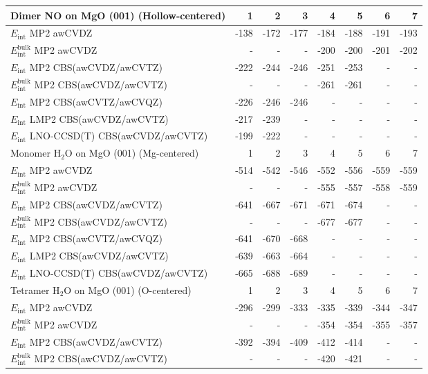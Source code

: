 \begin{longtable}{lrrrrrrr}
\toprule
Dimer NO on MgO (001) (Hollow-centered) & 1 & 2 & 3 & 4 & 5 & 6 & 7 \\ 
\midrule
$E_\textrm{int}$ MP2 awCVDZ & -138 & -172 & -177 & -184 & -188 & -191 & -193 \\
$E_\textrm{int}^\textrm{bulk}$ MP2 awCVDZ & - & - & - & -200 & -200 & -201 & -202 \\
$E_\textrm{int}$ MP2 CBS(awCVDZ/awCVTZ) & -222 & -244 & -246 & -251 & -253 & - & - \\
$E_\textrm{int}^\textrm{bulk}$ MP2 CBS(awCVDZ/awCVTZ) & - & - & - & -261 & -261 & - & - \\
$E_\textrm{int}$ MP2 CBS(awCVTZ/awCVQZ) & -226 & -246 & -246 & - & - & - & - \\
$E_\textrm{int}$ LMP2 CBS(awCVDZ/awCVTZ) & -217 & -239 & - & - & - & - & - \\
$E_\textrm{int}$ LNO-CCSD(T) CBS(awCVDZ/awCVTZ) & -199 & -222 & - & - & - & - & - \\
\toprule
Monomer H$_2$O on MgO (001) (Mg-centered) & 1 & 2 & 3 & 4 & 5 & 6 & 7 \\ 
\midrule
$E_\textrm{int}$ MP2 awCVDZ & -514 & -542 & -546 & -552 & -556 & -559 & -559 \\
$E_\textrm{int}^\textrm{bulk}$ MP2 awCVDZ & - & - & - & -555 & -557 & -558 & -559 \\
$E_\textrm{int}$ MP2 CBS(awCVDZ/awCVTZ) & -641 & -667 & -671 & -671 & -674 & - & - \\
$E_\textrm{int}^\textrm{bulk}$ MP2 CBS(awCVDZ/awCVTZ) & - & - & - & -677 & -677 & - & - \\
$E_\textrm{int}$ MP2 CBS(awCVTZ/awCVQZ) & -641 & -670 & -668 & - & - & - & - \\
$E_\textrm{int}$ LMP2 CBS(awCVDZ/awCVTZ) & -639 & -663 & -664 & - & - & - & - \\
$E_\textrm{int}$ LNO-CCSD(T) CBS(awCVDZ/awCVTZ) & -665 & -688 & -689 & - & - & - & - \\
\toprule
Tetramer H$_2$O on MgO (001) (O-centered) & 1 & 2 & 3 & 4 & 5 & 6 & 7 \\ 
\midrule
$E_\textrm{int}$ MP2 awCVDZ & -296 & -299 & -333 & -335 & -339 & -344 & -347 \\
$E_\textrm{int}^\textrm{bulk}$ MP2 awCVDZ & - & - & - & -354 & -354 & -355 & -357 \\
$E_\textrm{int}$ MP2 CBS(awCVDZ/awCVTZ) & -392 & -394 & -409 & -412 & -414 & - & - \\
$E_\textrm{int}^\textrm{bulk}$ MP2 CBS(awCVDZ/awCVTZ) & - & - & - & -420 & -421 & - & - \\

\end{longtable}
